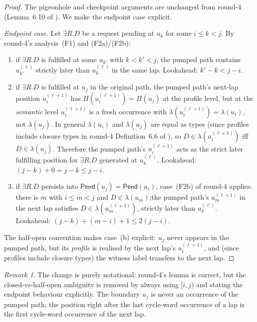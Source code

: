 \documentclass[11pt]{article}
\theoremstyle{definition}
\theoremstyle{remark}
\newtheorem{remark}[theorem]{Remark}
\newcommand{\Pend}{\mathsf{Pend}}
\begin{document}
\begin{proof}
The pigeonhole and checkpoint arguments are unchanged from
round-4 (Lemma~6.10 of \cite{GPT55Repaired}).  We make the endpoint
case explicit.

\emph{Endpoint case.}  Let $\exists R.D$ be a request pending at
$u_k$ for some $i\leq k<j$.  By round-4's analysis~(F1) and
(F2a)/(F2b):
\begin{enumerate}[label=(\alph*)]
\item if $\exists R.D$ is fulfilled at some $u_{k'}$ with
$k<k'<j$, the pumped path contains $u_{k'}^{(\ell)}$ strictly
later than $u_k^{(\ell)}$ in the same lap.  Lookahead:
$k'-k<j-i$.

\item if $\exists R.D$ is fulfilled at $u_j$ in the original path,
the pumped path's next-lap position $u_i^{(\ell+1)}$ has
$\Pi(u_i^{(\ell+1)})=\Pi(u_j)$ at the profile level, but at the
\emph{semantic} level $u_i^{(\ell+1)}$ is a fresh occurrence with
$\lambda(u_i^{(\ell+1)})=\lambda(u_i)$, not $\lambda(u_j)$.  In
general $\lambda(u_i)$ and $\lambda(u_j)$ are equal as types
(since profiles include closure types in round-4 Definition~6.6 of
\cite{GPT55Repaired}), so $D\in\lambda(u_i^{(\ell+1)})$ iff
$D\in\lambda(u_j)$.  Therefore the pumped path's $u_i^{(\ell+1)}$
acts as the strict later fulfilling position for $\exists R.D$
generated at $u_k^{(\ell)}$.  Lookahead: $(j-k)+0=j-k\leq j-i$.

\item if $\exists R.D$ persists into $\Pend(u_j)=\Pend(u_i)$,
case~(F2b) of round-4 applies: there is $m$ with $i\leq m<j$ and
$D\in\lambda(u_m)$;\@ the pumped path's $u_m^{(\ell+1)}$ in the
next lap satisfies $D\in\lambda(u_m^{(\ell+1)})$, strictly later
than $u_k^{(\ell)}$.  Lookahead: $(j-k)+(m-i)+1\leq 2(j-i)$.
\end{enumerate}
The half-open convention makes case~(b) explicit: $u_j$ never
appears in the pumped path, but its \emph{profile} is realised by
the next lap's $u_i^{(\ell+1)}$, and (since profiles include
closure types) the witness label transfers to the next lap.
\end{proof}

\begin{remark}
The change is purely notational: round-4's lemma is correct, but
the closed-vs-half-open ambiguity is removed by always using
$[i,j)$ and stating the endpoint behaviour explicitly.  The
boundary $u_j$ is never an occurrence of the pumped path; the
position right after the last cycle-word occurrence of a lap is
the first cycle-word occurrence of the next lap.
\end{remark}
\end{document}
